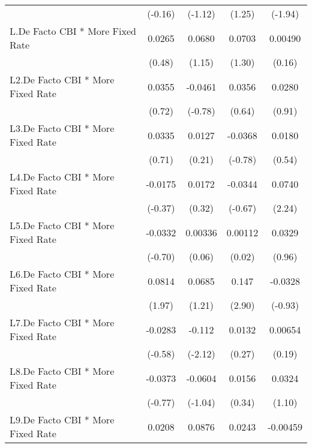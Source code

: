 {\begin{tabular}{l*{4}{c}}
                &  (-0.16)         &  (-1.12)         &   (1.25)         &  (-1.94)         \\
[1em]
L.De Facto CBI * More Fixed Rate&   0.0265         &   0.0680         &   0.0703         &  0.00490         \\
                &   (0.48)         &   (1.15)         &   (1.30)         &   (0.16)         \\
[1em]
L2.De Facto CBI * More Fixed Rate&   0.0355         &  -0.0461         &   0.0356         &   0.0280         \\
                &   (0.72)         &  (-0.78)         &   (0.64)         &   (0.91)         \\
[1em]
L3.De Facto CBI * More Fixed Rate&   0.0335         &   0.0127         &  -0.0368         &   0.0180         \\
                &   (0.71)         &   (0.21)         &  (-0.78)         &   (0.54)         \\
[1em]
L4.De Facto CBI * More Fixed Rate&  -0.0175         &   0.0172         &  -0.0344         &   0.0740\sym{*}  \\
                &  (-0.37)         &   (0.32)         &  (-0.67)         &   (2.24)         \\
[1em]
L5.De Facto CBI * More Fixed Rate&  -0.0332         &  0.00336         &  0.00112         &   0.0329         \\
                &  (-0.70)         &   (0.06)         &   (0.02)         &   (0.96)         \\
[1em]
L6.De Facto CBI * More Fixed Rate&   0.0814\sym{*}  &   0.0685         &    0.147\sym{**} &  -0.0328         \\
                &   (1.97)         &   (1.21)         &   (2.90)         &  (-0.93)         \\
[1em]
L7.De Facto CBI * More Fixed Rate&  -0.0283         &   -0.112\sym{*}  &   0.0132         &  0.00654         \\
                &  (-0.58)         &  (-2.12)         &   (0.27)         &   (0.19)         \\
[1em]
L8.De Facto CBI * More Fixed Rate&  -0.0373         &  -0.0604         &   0.0156         &   0.0324         \\
                &  (-0.77)         &  (-1.04)         &   (0.34)         &   (1.10)         \\
[1em]
L9.De Facto CBI * More Fixed Rate&   0.0208         &   0.0876         &   0.0243         & -0.00459         \\

\end{tabular}}
